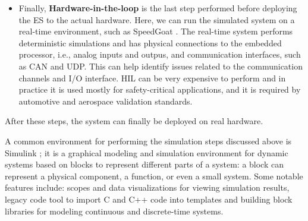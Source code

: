 \begin{itemize}
    \item Finally, \textbf{Hardware-in-the-loop} is the last step performed before deploying the ES to the actual hardware. Here, we can run the simulated system on a real-time environment, such as SpeedGoat \cite{SpeedGoat}. The real-time system performs deterministic simulations and has physical connections to the embedded processor, i.e., analog inputs and outpus, and communication interfaces, such as CAN and UDP. This can help identify issues related to the communication channels and I/O interface. HIL can be very expensive to perform and in practice it is used mostly for safety-critical applications, and it is required by automotive and aerospace validation standards. 
\end{itemize}

After these steps, the system can finally be deployed on real hardware.

A common environment for performing the simulation steps discussed above is Simulink \cite{Simulink}; it is a graphical modeling and simulation environment for dynamic systems based on blocks to represent different parts of a system: a block can represent a physical component, a function, or even a small system. Some notable features include: scopes and data visualizations for viewing simulation results, legacy code tool to import C and C++ code into templates and building block libraries for modeling continuous and discrete-time systems.



